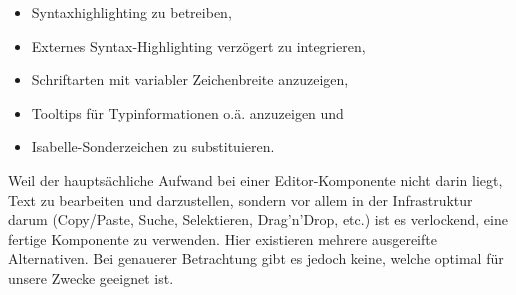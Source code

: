 \begin{itemize}
  \item Syntaxhighlighting zu betreiben,
  \item Externes Syntax-Highlighting verzögert zu integrieren,
  \item Schriftarten mit variabler Zeichenbreite anzuzeigen,
  \item Tooltips für Typinformationen o.ä. anzuzeigen und
  \item Isabelle-Sonderzeichen zu substituieren.
\end{itemize}

Weil der hauptsächliche Aufwand bei einer Editor-Komponente nicht darin liegt, Text zu bearbeiten und
darzustellen, sondern vor allem in der Infrastruktur darum (Copy/Paste, Suche, Selektieren,
Drag'n'Drop, etc.) ist es verlockend, eine fertige Komponente zu verwenden. Hier existieren mehrere
ausgereifte Alternativen. Bei genauerer Betrachtung gibt es jedoch keine, welche optimal für unsere
Zwecke geeignet ist. 

